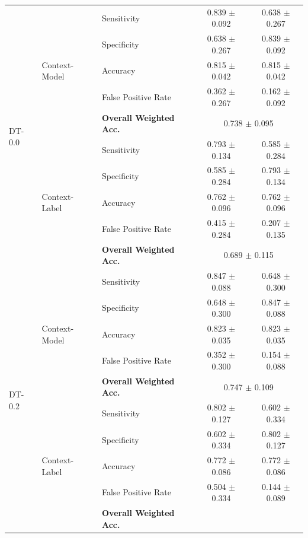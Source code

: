 \begin{table}[ht]
\begin{tabular}{l|llcc}
\multirow{10}{*}{DT-0.0}
  & \multirow{5}{*}{Context-Model}
      & Sensitivity            & 0.839 $\pm$ 0.092 & 0.638 $\pm$ 0.267 \\
  &   & Specificity            & 0.638 $\pm$ 0.267 & 0.839 $\pm$ 0.092 \\
  &   & Accuracy               & 0.815 $\pm$ 0.042 & 0.815 $\pm$ 0.042 \\
  &   & False Positive Rate    & 0.362 $\pm$ 0.267 & 0.162 $\pm$ 0.092 \\
  &   & \textbf{Overall Weighted Acc.}
                                & \multicolumn{2}{c}{0.738 $\pm$ 0.095} \\ \cmidrule{2-5}
  & \multirow{5}{*}{Context-Label}
      & Sensitivity            & 0.793 $\pm$ 0.134 & 0.585 $\pm$ 0.284 \\
  &   & Specificity            & 0.585 $\pm$ 0.284 & 0.793 $\pm$ 0.134 \\
  &   & Accuracy               & 0.762 $\pm$ 0.096 & 0.762 $\pm$ 0.096 \\
  &   & False Positive Rate    & 0.415 $\pm$ 0.284 & 0.207 $\pm$ 0.135 \\
  &   & \textbf{Overall Weighted Acc.}
                                & \multicolumn{2}{c}{0.689 $\pm$ 0.115} \\ \midrule
\multirow{10}{*}{DT-0.2}
  & \multirow{5}{*}{Context-Model}
      & Sensitivity            & 0.847 $\pm$ 0.088 & 0.648 $\pm$ 0.300 \\
  &   & Specificity            & 0.648 $\pm$ 0.300 & 0.847 $\pm$ 0.088 \\
  &   & Accuracy               & 0.823 $\pm$ 0.035 & 0.823 $\pm$ 0.035 \\
  &   & False Positive Rate    & 0.352 $\pm$ 0.300 & 0.154 $\pm$ 0.088 \\
  &   & \textbf{Overall Weighted Acc.}
                                & \multicolumn{2}{c}{0.747 $\pm$ 0.109} \\ \cmidrule{2-5}
  & \multirow{5}{*}{Context-Label}
      & Sensitivity            & 0.802 $\pm$ 0.127 & 0.602 $\pm$ 0.334 \\
  &   & Specificity            & 0.602 $\pm$ 0.334 & 0.802 $\pm$ 0.127 \\
  &   & Accuracy               & 0.772 $\pm$ 0.086 & 0.772 $\pm$ 0.086 \\
  &   & False Positive Rate    & 0.504 $\pm$ 0.334 & 0.144 $\pm$ 0.089 \\
  &   & \textbf{Overall Weighted Acc.}

\end{tabular}
\end{table}
